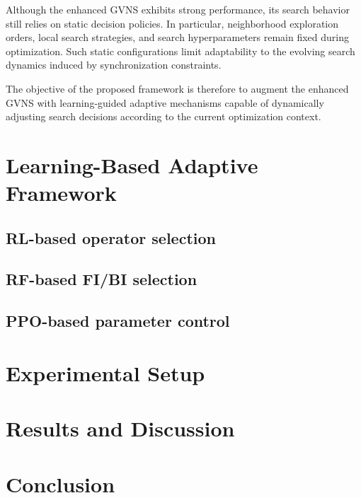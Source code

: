 \documentclass[preprint,12pt]{elsarticle}
\begin{document}
Although the enhanced GVNS exhibits strong performance, its search behavior still relies on static decision policies. In particular, neighborhood exploration orders, local search strategies, and search hyperparameters remain fixed during optimization. Such static configurations limit adaptability to the evolving search dynamics induced by synchronization constraints.

The objective of the proposed framework is therefore to augment the enhanced GVNS with learning-guided adaptive mechanisms capable of dynamically adjusting search decisions according to the current optimization context.

\section{Learning-Based Adaptive Framework} 
\label{sec:framework}

\subsection{RL-based operator selection} 
\subsection{RF-based FI/BI selection} 
\subsection{PPO-based parameter control}

\section{Experimental Setup}
\label{sec:setup}

\section{Results and Discussion}
\label{sec:results}

\section{Conclusion}
\label{sec:conclusion}



\end{document}
